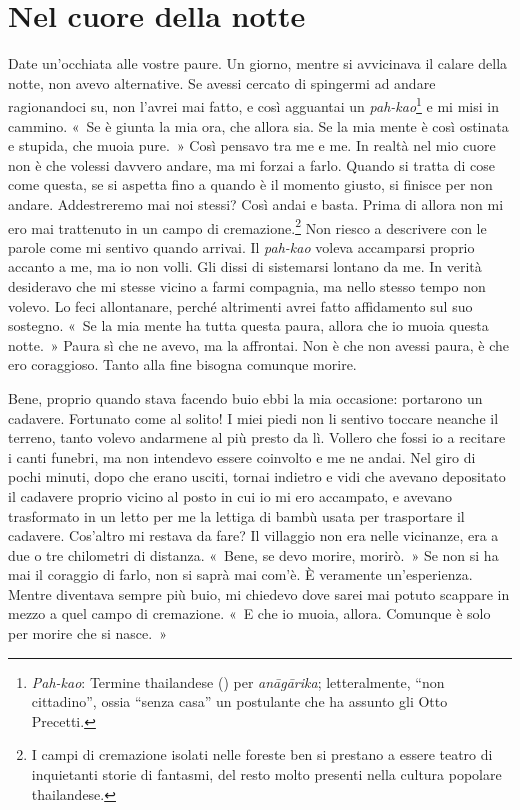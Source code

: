 \chapter{Nel cuore della notte}

Date un'occhiata alle vostre paure. Un giorno, mentre si avvicinava il
calare della notte, non avevo alternative. Se avessi cercato di
spingermi ad andare ragionandoci su, non l'avrei mai fatto, e così
agguantai un \emph{pah-kao}\footnote{\emph{Pah-kao}: Termine thailandese
  () per \emph{anāgārika}; letteralmente, ``non
  cittadino'', ossia ``senza casa'' un postulante che ha assunto gli
  Otto Precetti.} e mi misi in cammino. «~Se è giunta la mia ora, che
allora sia. Se la mia mente è così ostinata e stupida, che muoia pure.~»
Così pensavo tra me e me. In realtà nel mio cuore non è che volessi
davvero andare, ma mi forzai a farlo. Quando si tratta di cose come
questa, se si aspetta fino a quando è il momento giusto, si finisce per
non andare. Addestreremo mai noi stessi? Così andai e basta. Prima di
allora non mi ero mai trattenuto in un campo di cremazione.\footnote{I
  campi di cremazione isolati nelle foreste ben si prestano a essere
  teatro di inquietanti storie di fantasmi, del resto molto presenti
  nella cultura popolare thailandese.} Non riesco a descrivere con le
parole come mi sentivo quando arrivai. Il \emph{pah-kao} voleva
accamparsi proprio accanto a me, ma io non volli. Gli dissi di
sistemarsi lontano da me. In verità desideravo che mi stesse vicino a
farmi compagnia, ma nello stesso tempo non volevo. Lo feci allontanare,
perché altrimenti avrei fatto affidamento sul suo sostegno. «~Se la mia
mente ha tutta questa paura, allora che io muoia questa notte.~» Paura
sì che ne avevo, ma la affrontai. Non è che non avessi paura, è che ero
coraggioso. Tanto alla fine bisogna comunque morire.

Bene, proprio quando stava facendo buio ebbi la mia occasione: portarono
un cadavere. Fortunato come al solito! I miei piedi non li sentivo
toccare neanche il terreno, tanto volevo andarmene al più presto da lì.
Vollero che fossi io a recitare i canti funebri, ma non intendevo essere
coinvolto e me ne andai. Nel giro di pochi minuti, dopo che erano
usciti, tornai indietro e vidi che avevano depositato il cadavere
proprio vicino al posto in cui io mi ero accampato, e avevano
trasformato in un letto per me la lettiga di bambù usata per trasportare
il cadavere. Cos'altro mi restava da fare? Il villaggio non era nelle
vicinanze, era a due o tre chilometri di distanza. «~Bene, se devo
morire, morirò.~» Se non si ha mai il coraggio di farlo, non si saprà
mai com'è. È veramente un'esperienza. Mentre diventava sempre più buio,
mi chiedevo dove sarei mai potuto scappare in mezzo a quel campo di
cremazione. «~E che io muoia, allora. Comunque è solo per morire che si
nasce.~»

